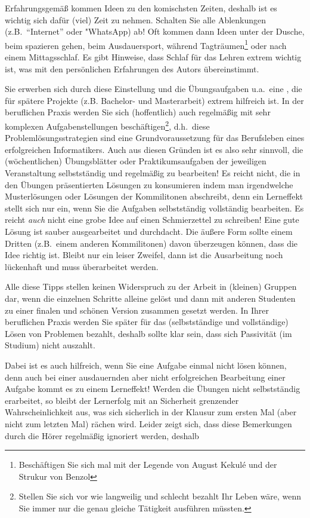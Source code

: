 Erfahrungsgemäß kommen Ideen zu den komischsten Zeiten, deshalb ist es wichtig
sich dafür (viel) Zeit zu nehmen. Schalten Sie alle Ablenkungen (z.B.~"`Internet"' oder  
"WhatsApp) ab! Oft kommen dann Ideen unter der Dusche, beim spazieren gehen, beim 
Ausdauersport, während Tagträumen\footnote{Beschäftigen Sie sich mal 
mit der Legende von  August Kekulé und der Strukur von Benzol} oder nach einem 
Mittagsschlaf. Es gibt Hinweise, dass Schlaf für das Lehren extrem wichtig ist, was
mit den persönlichen Erfahrungen des Autors übereinstimmt.

Sie erwerben sich durch diese Einstellung und die Übungsaufgaben u.a.~eine
, die für spätere Projekte (z.B. Bachelor- und
Masterarbeit) extrem hilfreich ist. In der beruflichen Praxis werden
Sie sich (hoffentlich) auch regelmäßig mit sehr komplexen Aufgabenstellungen
beschäftigen\footnote{Stellen Sie sich vor wie langweilig und schlecht bezahlt Ihr Leben 
wäre, wenn Sie immer nur die genau gleiche Tätigkeit ausführen müssten.}, d.h.~diese 
Problemlösungsstrategien sind eine Grundvoraussetzung für das Berufsleben eines 
erfolgreichen Informatikers. Auch aus diesen Gründen ist es also sehr sinnvoll, die
(wöchentlichen) Übungsblätter oder Praktikumsaufgaben der jeweiligen
Veranstaltung selbstständig und regelmäßig zu bearbeiten! Es reicht
nicht, die in den Übungen präsentierten Lösungen zu konsumieren indem man irgendwelche 
Musterlösungen oder Lösungen der Kommilitonen abschreibt, denn
ein Lerneffekt stellt sich nur ein, wenn Sie die Aufgaben
selbstständig vollständig bearbeiten. Es reicht \emph{auch} nicht eine grobe Idee auf einen Schmierzettel zu schreiben! Eine gute Lösung ist sauber ausgearbeitet und durchdacht. Die äußere Form sollte einem Dritten (z.B.~einem anderen Kommilitonen) davon überzeugen können, dass die Idee richtig ist. Bleibt nur ein leiser Zweifel, dann ist die Ausarbeitung noch lückenhaft und muss überarbeitet werden. 

Alle diese Tipps  stellen keinen Widerspruch zu der Arbeit in (kleinen) Gruppen dar, wenn die einzelnen Schritte alleine gelöst und dann mit anderen Studenten zu einer finalen und  schönen Version zusammen gesetzt werden. In Ihrer beruflichen Praxis werden Sie später für das (selbstständige und vollständige) Lösen von Problemen bezahlt, deshalb sollte  klar sein, dass sich Passivität (im Studium) nicht auszahlt. 
 
Dabei ist es auch hilfreich, wenn Sie eine Aufgabe einmal nicht lösen können,
denn auch bei einer ausdauernden aber nicht erfolgreichen Bearbeitung
einer Aufgabe kommt es zu einem Lerneffekt! Werden die Übungen nicht
selbstständig erarbeitet, so bleibt der Lernerfolg mit an Sicherheit
grenzender Wahrscheinlichkeit aus, was sich sicherlich in der Klausur
zum ersten Mal (aber nicht zum letzten Mal) rächen wird. Leider zeigt
sich, dass diese Bemerkungen durch die Hörer regelmäßig ignoriert
werden, deshalb

